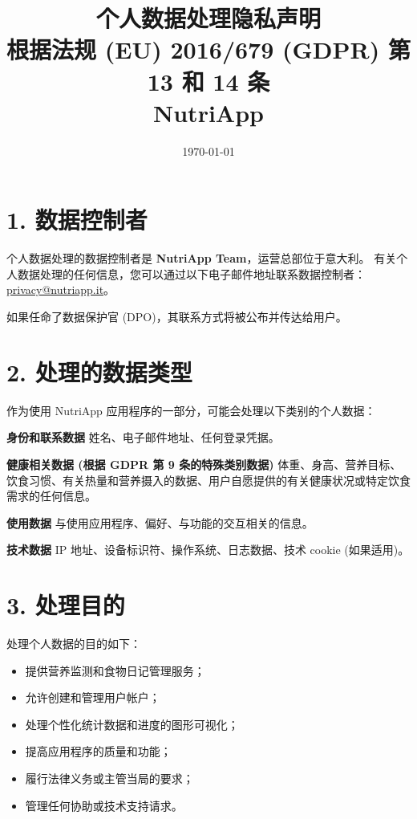 \documentclass[a4paper,12pt]{article}
\title{\textbf{个人数据处理隐私声明}\\
根据法规 (EU) 2016/679 (GDPR) 第 13 和 14 条\\
NutriApp}
\date{\today}
\begin{document}
    \maketitle

    \section*{1. 数据控制者}

    个人数据处理的数据控制者是 \textbf{NutriApp Team}，运营总部位于意大利。
    有关个人数据处理的任何信息，您可以通过以下电子邮件地址联系数据控制者：
    \href{mailto:privacy@nutriapp.it}{privacy@nutriapp.it}。

    如果任命了数据保护官 (DPO)，其联系方式将被公布并传达给用户。

    \section*{2. 处理的数据类型}

    作为使用 NutriApp 应用程序的一部分，可能会处理以下类别的个人数据：

    \textbf{身份和联系数据}
    姓名、电子邮件地址、任何登录凭据。

    \textbf{健康相关数据 (根据 GDPR 第 9 条的特殊类别数据)}
    体重、身高、营养目标、饮食习惯、有关热量和营养摄入的数据、用户自愿提供的有关健康状况或特定饮食需求的任何信息。

    \textbf{使用数据}
    与使用应用程序、偏好、与功能的交互相关的信息。

    \textbf{技术数据}
    IP 地址、设备标识符、操作系统、日志数据、技术 cookie (如果适用)。

    \section*{3. 处理目的}

    处理个人数据的目的如下：

    \begin{itemize}
        \item 提供营养监测和食物日记管理服务；
        \item 允许创建和管理用户帐户；
        \item 处理个性化统计数据和进度的图形可视化；
        \item 提高应用程序的质量和功能；
        \item 履行法律义务或主管当局的要求；
        \item 管理任何协助或技术支持请求。
    \end{itemize}
\end{document}
